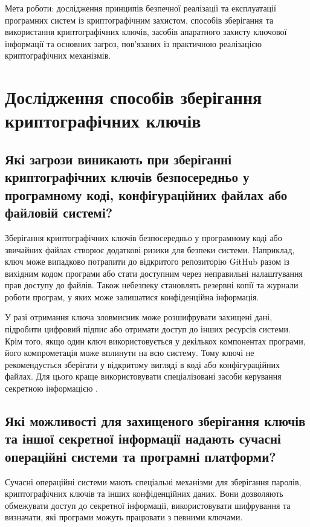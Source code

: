 \noindent Мета роботи: дослідження принципів безпечної реалізації та експлуатації програмних
систем із криптографічним захистом, способів зберігання та використання
криптографічних ключів, засобів апаратного захисту ключової інформації та основних
загроз, пов’язаних із практичною реалізацією криптографічних механізмів.

\section{Дослідження способів зберігання криптографічних ключів}

\subsection{Які загрози виникають при зберіганні криптографічних 
ключів безпосередньо у програмному коді, конфігураційних файлах або файловій системі?}

Зберігання криптографічних ключів безпосередньо у програмному коді 
або звичайних файлах створює додаткові ризики для безпеки системи. 
Наприклад, ключ може випадково потрапити до відкритого репозиторію 
GitHub разом із вихідним кодом програми або стати доступним через 
неправильні налаштування прав доступу до файлів. Також небезпеку 
становлять резервні копії та журнали роботи програм, у яких може 
залишатися конфіденційна інформація.

У разі отримання ключа зловмисник може розшифрувати захищені дані, 
підробити цифровий підпис або отримати доступ до інших ресурсів системи. 
Крім того, якщо один ключ використовується у декількох компонентах програми, 
його компрометація може вплинути на всю систему. Тому ключі не рекомендується 
зберігати у відкритому вигляді в коді або конфігураційних файлах. Для цього краще 
використовувати спеціалізовані засоби керування секретною інформацією \cite{owaspkey,owaspstorage}.

\subsection{Які можливості для захищеного зберігання ключів та іншої секретної інформації надають сучасні операційні системи та програмні платформи?}

Сучасні операційні системи мають спеціальні механізми для зберігання паролів, 
криптографічних ключів та інших конфіденційних даних. Вони дозволяють 
обмежувати доступ до секретної інформації, використовувати шифрування та визначати, 
які програми можуть працювати з певними ключами.

